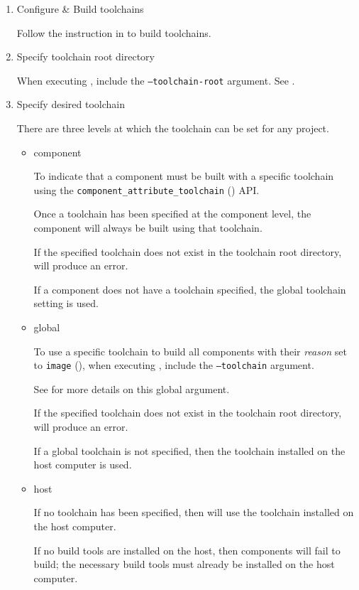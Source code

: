 \begin{enumerate}
\item Configure \& Build toolchains

  Follow the instruction in  to
  build toolchains.

\item Specify toolchain root directory

  When executing \lmsbw, include the \texttt{--toolchain-root}
  argument.  See .

\item Specify desired toolchain

  There are three levels at which the toolchain can be set for any
  project.

  \begin{itemize}
  \item component

    To indicate that a component must be built with a specific
    toolchain using the \texttt{component\_attribute\_toolchain}
    () API.

    Once a toolchain has been specified at the component level, the
    component will always be built using that toolchain.

    If the specified toolchain does not exist in the toolchain root
    directory, \lmsbw will produce an error.

    If a component does not have a toolchain specified, the global
    toolchain setting is used.

  \item global

    To use a specific toolchain to build all components with their
    \emph{reason} set to \texttt{image} (),
    when executing \lmsbw, include the \texttt{--toolchain} argument.

    See  for more details on this global
    argument.

    If the specified toolchain does not exist in the toolchain root
    directory, \lmsbw will produce an error.

    If a global toolchain is not specified, then the toolchain
    installed on the host computer is used.

  \item host

    If no toolchain has been specified, then \lmsbw will use the
    toolchain installed on the host computer.

    If no build tools are installed on the host, then components will
    fail to build; the necessary build tools must already be installed
    on the host computer.

  \end{itemize}

\end{enumerate}

